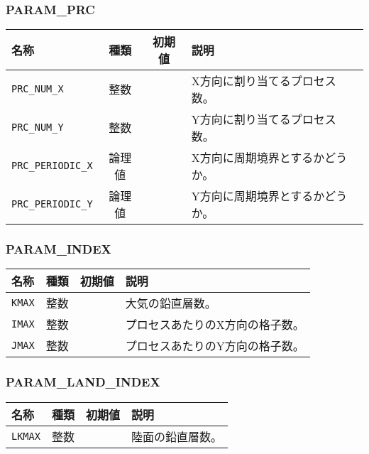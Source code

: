 \subsubsection{PARAM\_PRC}
\begin{tabularx}{150mm}{|l|c|c|X|} \hline
 \rowcolor[gray]{0.9} 名称 & 種類 & 初期値 & 説明 \\ \hline
 \verb|PRC_NUM_X| & 整数 &  & X方向に割り当てるプロセス数。 \\ \hline
 \verb|PRC_NUM_Y| & 整数 &  & Y方向に割り当てるプロセス数。 \\ \hline
 \verb|PRC_PERIODIC_X| & 論理値 &  & X方向に周期境界とするかどうか。 \\ \hline
 \verb|PRC_PERIODIC_Y| & 論理値 &  & Y方向に周期境界とするかどうか。 \\ \hline
\end{tabularx}


\subsubsection{PARAM\_INDEX}
\begin{tabularx}{150mm}{|l|c|c|X|} \hline
 \rowcolor[gray]{0.9} 名称 & 種類 & 初期値 & 説明 \\ \hline
 \verb|KMAX| & 整数 &  & 大気の鉛直層数。 \\ \hline
 \verb|IMAX| & 整数 &  & プロセスあたりのX方向の格子数。 \\ \hline
 \verb|JMAX| & 整数 &  & プロセスあたりのY方向の格子数。 \\ \hline
\end{tabularx}


\subsubsection{PARAM\_LAND\_INDEX}
\begin{tabularx}{150mm}{|l|c|c|X|} \hline
 \rowcolor[gray]{0.9} 名称 & 種類 & 初期値 & 説明 \\ \hline
 \verb|LKMAX| & 整数 &  & 陸面の鉛直層数。 \\ \hline
\end{tabularx}


